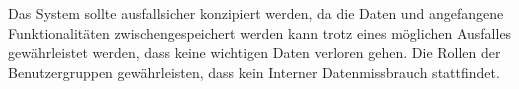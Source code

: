 \documentclass[../../Pflichtenheft.tex]{subfiles}
\begin{document}
    Das System sollte ausfallsicher konzipiert werden, da die Daten und angefangene Funktionalitäten zwischengespeichert werden
    kann trotz eines möglichen Ausfalles gewährleistet werden, dass keine wichtigen Daten verloren gehen.
    Die Rollen der Benutzergruppen gewährleisten, dass kein Interner Datenmissbrauch stattfindet.
\end{document}
